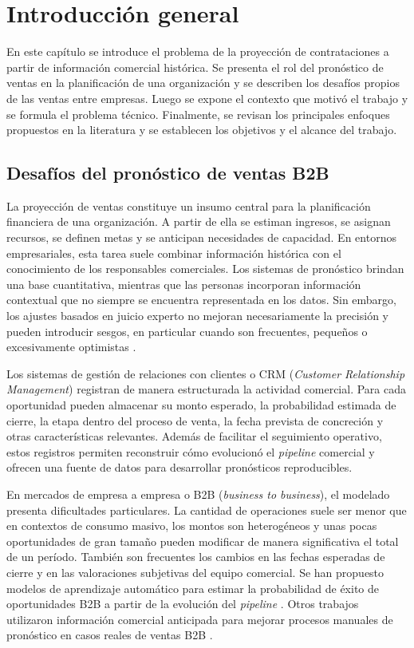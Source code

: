 
\chapter{Introducción general}

\label{Chapter1}
\label{IntroGeneral}

En este capítulo se introduce el problema de la proyección de contrataciones a partir de información comercial histórica. Se presenta el rol del pronóstico de ventas en la planificación de una organización y se describen los desafíos propios de las ventas entre empresas. Luego se expone el contexto que motivó el trabajo y se formula el problema técnico. Finalmente, se revisan los principales enfoques propuestos en la literatura y se establecen los objetivos y el alcance del trabajo.

\section{Desafíos del pronóstico de ventas B2B}
\label{sec:desafiosPronosticoB2B}

La proyección de ventas constituye un insumo central para la planificación financiera de una organización. A partir de ella se estiman ingresos, se asignan recursos, se definen metas y se anticipan necesidades de capacidad. En entornos empresariales, esta tarea suele combinar información histórica con el conocimiento de los responsables comerciales. Los sistemas de pronóstico brindan una base cuantitativa, mientras que las personas incorporan información contextual que no siempre se encuentra representada en los datos. Sin embargo, los ajustes basados en juicio experto no mejoran necesariamente la precisión y pueden introducir sesgos, en particular cuando son frecuentes, pequeños o excesivamente optimistas \citep{Fildes2009}.

Los sistemas de gestión de relaciones con clientes o CRM (\textit{Customer Relationship Management}) registran de manera estructurada la actividad comercial. Para cada oportunidad pueden almacenar su monto esperado, la probabilidad estimada de cierre, la etapa dentro del proceso de venta, la fecha prevista de concreción y otras características relevantes. Además de facilitar el seguimiento operativo, estos registros permiten reconstruir cómo evolucionó el \textit{pipeline} comercial y ofrecen una fuente de datos para desarrollar pronósticos reproducibles.

En mercados de empresa a empresa o B2B (\textit{business to business}), el modelado presenta dificultades particulares. La cantidad de operaciones suele ser menor que en contextos de consumo masivo, los montos son heterogéneos y unas pocas oportunidades de gran tamaño pueden modificar de manera significativa el total de un período. También son frecuentes los cambios en las fechas esperadas de cierre y en las valoraciones subjetivas del equipo comercial. Se han propuesto modelos de aprendizaje automático para estimar la probabilidad de éxito de oportunidades B2B a partir de la evolución del \textit{pipeline} \citep{Yan2015}. Otros trabajos utilizaron información comercial anticipada para mejorar procesos manuales de pronóstico en casos reales de ventas B2B \citep{Rohaan2022}.


